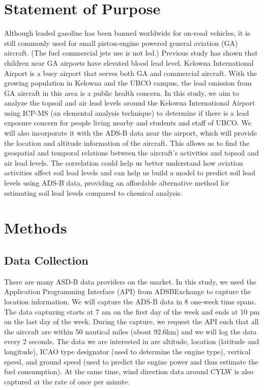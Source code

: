 \documentclass[12pt]{article}
\begin{document}
\section{Statement of Purpose}


Although leaded gasoline has been banned worldwide for on-road vehicles, it is still commonly used for small piston-engine powered general aviation (GA) aircraft. (The fuel commercial jets use is not led.) Previous study has shown that children near GA airports have elevated blood lead level.\cite{miranda_geospatial_2011} \cite{zahran_leaded_2023} \cite{mills_lead_2022} \cite{zahran_effect_2017} Kelowna International Airport is a busy airport that serves both GA and commercial aircraft. With the growing population in Kelowna and the UBCO campus, the lead emission from GA aircraft in this area is a public health concern. In this study, we aim to analyze the topsoil and air lead levels around the Kelowna International Airport using ICP-MS (an elemental analysis technique) to determine if there is a lead exposure concern for people living nearby and students and staff of UBCO. We will also incorporate it with the ADS-B data near the airport, which will provide the location and altitude information of the aircraft. This allows us to find the geospatial and temporal relations between the aircraft's activities and topsoil and air lead levels. The correlation could help us better understand how aviation activities affect soil lead levels and can help us build a model to predict soil lead levels using ADS-B data, providing an affordable alternative method for estimating soil lead levels compared to chemical analysis.
\section{Methods}
\subsection{Data Collection}


There are many ASD-B data providers on the market. In this study, we used the Application Programming Interface (API) from ADSBExchange \cite{adsbexchange} to capture the location information. We will capture the ADS-B data in 8 one-week time spans. The data capturing starts at 7 am on the first day of the week and ends at 10 pm on the last day of the week. During the capture, we request the API such that all the aircraft are within 50 nautical miles (about 92.6km) and we will log the data every 2 seconds. The data we are interested in are altitude, location (latitude and longitude), ICAO type designator (used to determine the engine type), vertical speed, and ground speed (used to predict the engine power and thus estimate the fuel consumption). At the same time, wind direction data around CYLW is also captured at the rate of once per minute. 
\end{document}
